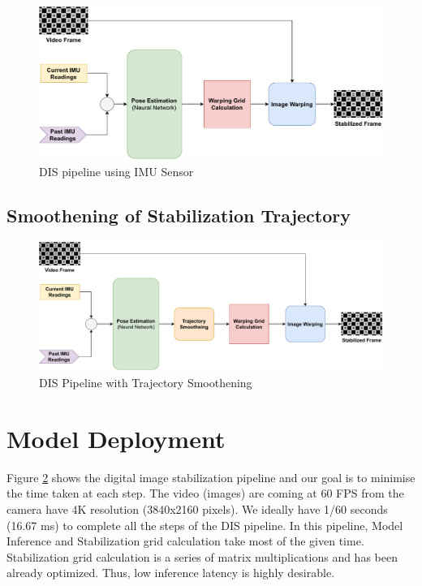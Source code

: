 \begin{figure}
    \centering
    \includegraphics[scale=0.9]{images/fig_chapter4/dis_pipleline.pdf}
    \caption{DIS pipeline using IMU Sensor}
    \label{fig:dis_pipeline}
\end{figure}

\subsection{Smoothening of Stabilization Trajectory}

\begin{figure}
    \centering
    \includegraphics[scale=0.78]{images/fig_chapter4/dis_smooth_pipeline.pdf}
    \caption{DIS Pipeline with Trajectory Smoothening}
    \label{fig:dis_smooth_pipeline}
\end{figure}

\section{Model Deployment}
Figure \ref{fig:dis_smooth_pipeline} shows the digital image stabilization pipeline and our goal is to minimise the time taken at each step. The video (images) are coming at 60 FPS from the camera have 4K resolution (3840x2160 pixels). We ideally have 1/60 seconds (16.67 ms) to complete all the steps of the DIS pipeline. In this pipeline, Model Inference and Stabilization grid calculation take most of the given time. Stabilization grid calculation is a series of matrix multiplications and has been already optimized. Thus, low inference latency is highly desirable.

